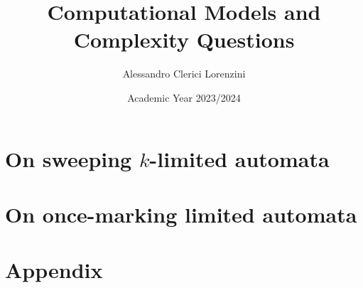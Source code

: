 \documentclass[a4paper]{report}
\title{Computational Models and Complexity Questions}
\author{Alessandro Clerici Lorenzini}
\date{Academic Year 2023/2024}
\begin{document}
\maketitle

\tableofcontents




\part{On sweeping \texorpdfstring{$k$}{k}-limited automata}



\part{On once-marking limited automata}



\appendix
\cleardoublepage
\part*{Appendix}


\printbibliography
\end{document}
